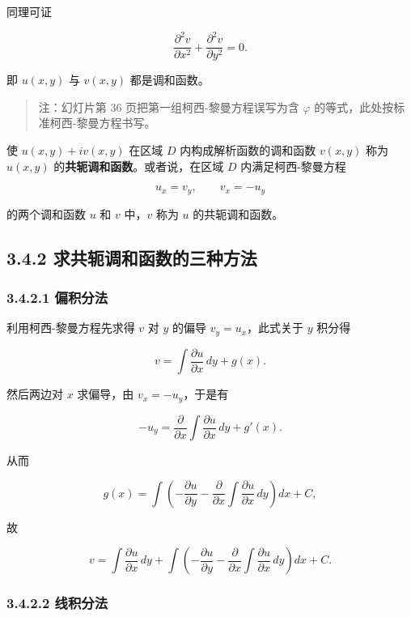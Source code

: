 同理可证

\[
\frac{\partial^2 v}{\partial x^2}+\frac{\partial^2 v}{\partial y^2}=0 .
\]

即 \(u(x,y)\) 与 \(v(x,y)\) 都是调和函数。

\begin{quote}
注：幻灯片第 36 页把第一组柯西-黎曼方程误写为含 \(\varphi\)
的等式，此处按标准柯西-黎曼方程书写。
\end{quote}

使 \(u(x,y)+iv(x,y)\) 在区域 \(D\) 内构成解析函数的调和函数 \(v(x,y)\)
称为 \(u(x,y)\) 的\textbf{共轭调和函数}。或者说，在区域 \(D\)
内满足柯西-黎曼方程

\[
u_x=v_y,\qquad v_x=-u_y
\]

的两个调和函数 \(u\) 和 \(v\) 中，\(v\) 称为 \(u\) 的共轭调和函数。

\subsection{3.4.2
求共轭调和函数的三种方法}\label{ux6c42ux5171ux8f6dux8c03ux548cux51fdux6570ux7684ux4e09ux79cdux65b9ux6cd5}

\subsubsection{3.4.2.1 偏积分法}\label{ux504fux79efux5206ux6cd5}

利用柯西-黎曼方程先求得 \(v\) 对 \(y\) 的偏导 \(v_y=u_x\)，此式关于
\(y\) 积分得

\[
v=\int\frac{\partial u}{\partial x}\,dy+g(x).
\]

然后两边对 \(x\) 求偏导，由 \(v_x=-u_y\)，于是有

\[
-u_y=\frac{\partial}{\partial x}\int\frac{\partial u}{\partial x}\,dy+g'(x).
\]

从而

\[
g(x)=\int\left(-\frac{\partial u}{\partial y}-\frac{\partial}{\partial x}\int\frac{\partial u}{\partial x}\,dy\right)dx+C,
\]

故

\[
v=\int\frac{\partial u}{\partial x}\,dy+\int\left(-\frac{\partial u}{\partial y}-\frac{\partial}{\partial x}\int\frac{\partial u}{\partial x}\,dy\right)dx+C .
\]

\subsubsection{3.4.2.2 线积分法}\label{ux7ebfux79efux5206ux6cd5}

